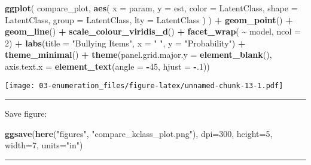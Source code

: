 \documentclass[
]{book}
\newenvironment{Shaded}{\begin{snugshade}}{\end{snugshade}}
\newcommand{\AttributeTok}[1]{\textcolor[rgb]{0.13,0.29,0.53}{#1}}
\newcommand{\DecValTok}[1]{\textcolor[rgb]{0.00,0.00,0.81}{#1}}
\newcommand{\FunctionTok}[1]{\textcolor[rgb]{0.13,0.29,0.53}{\textbf{#1}}}
\newcommand{\NormalTok}[1]{#1}
\newcommand{\SpecialCharTok}[1]{\textcolor[rgb]{0.81,0.36,0.00}{\textbf{#1}}}
\newcommand{\StringTok}[1]{\textcolor[rgb]{0.31,0.60,0.02}{#1}}
\begin{document}
\begin{Shaded}
\begin{Highlighting}[]
\FunctionTok{ggplot}\NormalTok{(}
\NormalTok{  compare\_plot,}
  \FunctionTok{aes}\NormalTok{(}
    \AttributeTok{x =}\NormalTok{ param,}
    \AttributeTok{y =}\NormalTok{ est,}
    \AttributeTok{color =}\NormalTok{ LatentClass,}
    \AttributeTok{shape =}\NormalTok{ LatentClass,}
    \AttributeTok{group =}\NormalTok{ LatentClass,}
    \AttributeTok{lty =}\NormalTok{ LatentClass}
\NormalTok{  )}
\NormalTok{) }\SpecialCharTok{+}
  \FunctionTok{geom\_point}\NormalTok{() }\SpecialCharTok{+} 
  \FunctionTok{geom\_line}\NormalTok{() }\SpecialCharTok{+}
  \FunctionTok{scale\_colour\_viridis\_d}\NormalTok{() }\SpecialCharTok{+}
  \FunctionTok{facet\_wrap}\NormalTok{( }\SpecialCharTok{\textasciitilde{}}\NormalTok{ model, }\AttributeTok{ncol =} \DecValTok{2}\NormalTok{) }\SpecialCharTok{+}
  \FunctionTok{labs}\NormalTok{(}\AttributeTok{title =} \StringTok{"Bullying Items"}\NormalTok{,}
       \AttributeTok{x =} \StringTok{" "}\NormalTok{, }\AttributeTok{y =} \StringTok{"Probability"}\NormalTok{) }\SpecialCharTok{+}
  \FunctionTok{theme\_minimal}\NormalTok{() }\SpecialCharTok{+}
  \FunctionTok{theme}\NormalTok{(}\AttributeTok{panel.grid.major.y =} \FunctionTok{element\_blank}\NormalTok{(),}
                          \AttributeTok{axis.text.x =} \FunctionTok{element\_text}\NormalTok{(}\AttributeTok{angle =} \SpecialCharTok{{-}}\DecValTok{45}\NormalTok{, }\AttributeTok{hjust =} \SpecialCharTok{{-}}\NormalTok{.}\DecValTok{1}\NormalTok{))                            }
\end{Highlighting}
\end{Shaded}

\texttt{[image: 03-enumeration\_files/figure-latex/unnamed-chunk-13-1.pdf]}

\begin{center}\rule{0.5\linewidth}{0.5pt}\end{center}

Save figure:

\begin{Shaded}
\begin{Highlighting}[]
\FunctionTok{ggsave}\NormalTok{(}\FunctionTok{here}\NormalTok{(}\StringTok{"figures"}\NormalTok{, }\StringTok{"compare\_kclass\_plot.png"}\NormalTok{), }\AttributeTok{dpi=}\DecValTok{300}\NormalTok{, }\AttributeTok{height=}\DecValTok{5}\NormalTok{, }\AttributeTok{width=}\DecValTok{7}\NormalTok{, }\AttributeTok{units=}\StringTok{"in"}\NormalTok{)}
\end{Highlighting}
\end{Shaded}

\begin{center}\rule{0.5\linewidth}{0.5pt}\end{center}
\end{document}
